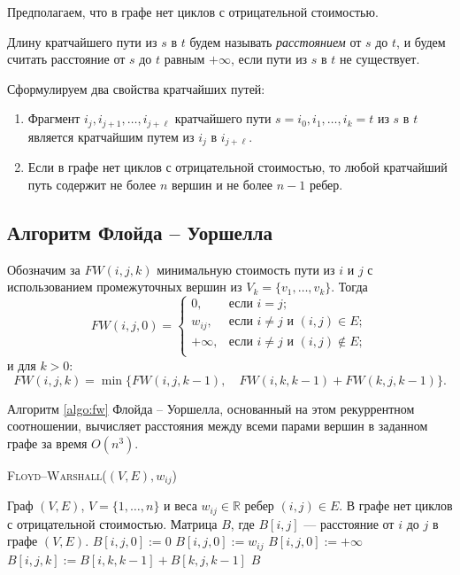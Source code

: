 \documentclass[a4paper,12pt]{article}
\newcommand{\algname}[1]{\textsc{#1}}
\begin{document}
Предполагаем, что в графе нет циклов с отрицательной стоимостью.

Длину кратчайшего пути из $s$ в $t$ будем называть \emph{расстоянием} от $s$ до $t$, и будем считать расстояние от $s$ до $t$ равным $+\infty$, если пути из $s$ в $t$ не существует.

Сформулируем два свойства кратчайших путей:
\begin{enumerate}
	\item Фрагмент $i_j, i_{j+1}, \dots, i_{j+\ell}$ кратчайшего пути $s = i_0, i_1, \ldots, i_k = t$ из $s$ в $t$ является кратчайшим путем из $i_j$ в $i_{j+\ell}$.
	\item Если в графе нет циклов с отрицательной стоимостью, то любой кратчайший путь содержит не более $n$ вершин и не более $n - 1$ ребер.
\end{enumerate}


\subsection{Алгоритм Флойда -- Уоршелла}
Обозначим за $FW(i, j, k)$ минимальную стоимость пути из $i$ и $j$ с использованием промежуточных вершин из $V_k = \{v_1, \ldots, v_k\}$. Тогда
\[FW(i, j, 0) =
	\begin{cases}
		0, & \text{если }i = j;\\
		w_{ij}, & \text{если }i \neq j\text{ и }(i, j) \in E;\\
		+\infty, & \text{если }i \neq j\text{ и }(i, j) \not\in E;\\
	\end{cases}
\]
и для $k > 0$:
\[FW(i, j, k) = \min\{FW(i, j, k-1), \quad FW(i, k, k-1) + FW(k, j, k - 1)\}.\]

Алгоритм \ref{algo:fw} Флойда -- Уоршелла, основанный на этом рекуррентном соотношении, вычисляет расстояния между всеми парами вершин в заданном графе за время $O(n^3)$.

\begin{algorithm}
  	\caption{\algname{Floyd--Warshall}($(V, E), w_{ij}$)}
	\label{algo:fw}
	\begin{algorithmic}%
		\Require Граф $(V, E)$, $V = \{1, \dots, n\}$ и веса $w_{ij} \in \mathbb{R}$ ребер $(i, j) \in E$. В графе нет циклов с отрицательной стоимостью.
		\Ensure Матрица $B$, где $B[i, j]$ --- расстояние от $i$ до $j$ в графе $(V, E)$.
		\State
					\State $B[i, j, 0] := 0$
					\State $B[i, j, 0] := w_{ij}$
				\Else
					\State $B[i, j, 0] := +\infty$
				\EndIf
			\EndFor
		\EndFor
		\State
						\State $B[i, j, k] := B[i, k, k-1] + B[k, j, k-1]$
					\EndIf
				\EndFor
			\EndFor
		\EndFor
		\State
		\Return $B$
	\end{algorithmic}
\end{algorithm}
\end{document}
